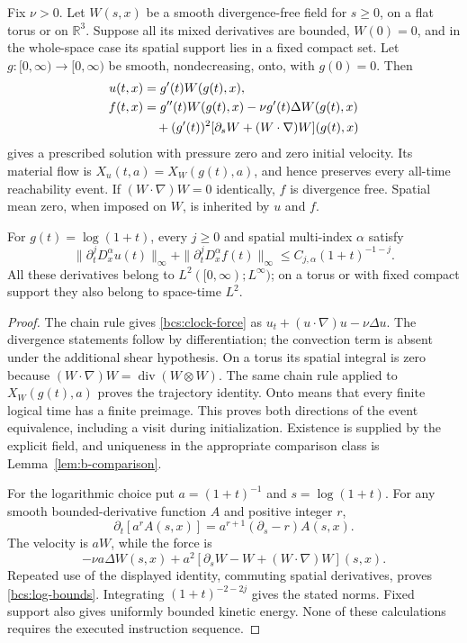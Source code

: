 \begin{lemma}\label{bcs:clock}
Fix $\nu>0$. Let $W(s,x)$ be a smooth divergence-free field for $s\ge0$, on a flat torus or on $\mathbb R^3$. Suppose all its mixed derivatives are bounded, $W(0)=0$, and in the whole-space case its spatial support lies in a fixed compact set. Let $g:[0,\infty)\to[0,\infty)$ be smooth, nondecreasing, onto, with $g(0)=0$. Then
\begin{align}
 u(t,x)&=g'(t)W(g(t),x),\\
 f(t,x)&=g''(t)W(g(t),x)-\nu g'(t)\Delta W(g(t),x)\notag\\
 &\quad +(g'(t))^2[\partial_sW+(W\cdot\nabla)W](g(t),x)
 \label{bcs:clock-force}
\end{align}
gives a prescribed solution with pressure zero and zero initial velocity. Its material flow is $X_u(t,a)=X_W(g(t),a)$, and hence preserves every all-time reachability event. If $(W\cdot\nabla)W=0$ identically, $f$ is divergence free. Spatial mean zero, when imposed on $W$, is inherited by $u$ and $f$.

For $g(t)=\log(1+t)$, every $j\ge0$ and spatial multi-index $\alpha$ satisfy
\begin{equation}\label{bcs:log-bounds}
 \|\partial_t^jD_x^\alpha u(t)\|_\infty+
 \|\partial_t^jD_x^\alpha f(t)\|_\infty
 \le C_{j,\alpha}(1+t)^{-1-j}.
\end{equation}
All these derivatives belong to $L^2([0,\infty);L^\infty)$; on a torus or with fixed compact support they also belong to space-time $L^2$.
\end{lemma}
\begin{proof}
The chain rule gives \eqref{bcs:clock-force} as $u_t+(u\cdot\nabla)u-\nu\Delta u$. The divergence statements follow by differentiation; the convection term is absent under the additional shear hypothesis. On a torus its spatial integral is zero because $(W\cdot\nabla)W=\operatorname{div}(W\otimes W)$. The same chain rule applied to $X_W(g(t),a)$ proves the trajectory identity. Onto means that every finite logical time has a finite preimage. This proves both directions of the event equivalence, including a visit during initialization. Existence is supplied by the explicit field, and uniqueness in the appropriate comparison class is Lemma~\ref{lem:b-comparison}.

For the logarithmic choice put $a=(1+t)^{-1}$ and $s=\log(1+t)$. For any smooth bounded-derivative function $A$ and positive integer $r$,
\[
 \partial_t[a^rA(s,x)]=a^{r+1}(\partial_s-r)A(s,x).
\]
The velocity is $aW$, while the force is
\[
 -\nu a\Delta W(s,x)+a^2[\partial_sW-W+(W\cdot\nabla)W](s,x).
\]
Repeated use of the displayed identity, commuting spatial derivatives, proves \eqref{bcs:log-bounds}. Integrating $(1+t)^{-2-2j}$ gives the stated norms. Fixed support also gives uniformly bounded kinetic energy. None of these calculations requires the executed instruction sequence.
\end{proof}
